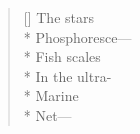 \label{ch:above_the_airstrip}
\begin{verse}[\versewidth]
The stars\\*
\hspace*{3\vgap} Phosphoresce---\\*
Fish scales\\*
\hspace*{3\vgap} In the ultra-\\*
\hspace*{4\vgap} Marine\\*
Net---
\end{verse}
